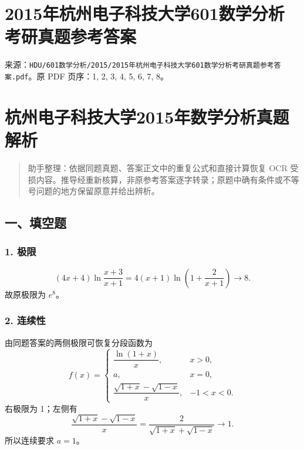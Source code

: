 \documentclass[11pt,fontset=fandol]{ctexart}
\begin{document}
\section{2015年杭州电子科技大学601数学分析考研真题参考答案}\label{ux5e74ux676dux5ddeux7535ux5b50ux79d1ux6280ux5927ux5b66601ux6570ux5b66ux5206ux6790ux8003ux7814ux771fux9898ux53c2ux8003ux7b54ux6848}

来源：\texttt{HDU/601数学分析/2015/2015年杭州电子科技大学601数学分析考研真题参考答案.pdf}。原
PDF 页序：1, 2, 3, 4, 5, 6, 7, 8。

\section{杭州电子科技大学2015年数学分析真题解析}\label{ux676dux5ddeux7535ux5b50ux79d1ux6280ux5927ux5b662015ux5e74ux6570ux5b66ux5206ux6790ux771fux9898ux89e3ux6790}

\begin{quote}
助手整理：依据同题真题、答案正文中的重复公式和直接计算恢复 OCR
受损内容。推导经重新核算，非原参考答案逐字转录；原题中确有条件或不等号问题的地方保留原意并给出辨析。
\end{quote}

\subsection{一、填空题}\label{ux4e00ux586bux7a7aux9898}

\subsubsection{1. 极限}\label{ux6781ux9650}

\[
(4x+4)\ln\frac{x+3}{x+1}=4(x+1)\ln\left(1+\frac2{x+1}\right)\longrightarrow8.
\] 故原极限为 \(\boxed{e^8}\)。

\subsubsection{2. 连续性}\label{ux8fdeux7eedux6027}

由同题答案的两侧极限可恢复分段函数为 \[
f(x)=\begin{cases}\dfrac{\ln(1+x)}x,&x>0,\\a,&x=0,\\\dfrac{\sqrt{1+x}-\sqrt{1-x}}x,&-1<x<0.\end{cases}
\] 右极限为 1；左侧有 \[
\frac{\sqrt{1+x}-\sqrt{1-x}}x=\frac2{\sqrt{1+x}+\sqrt{1-x}}\longrightarrow1.
\] 所以连续要求 \(\boxed{a=1}\)。
\end{document}
